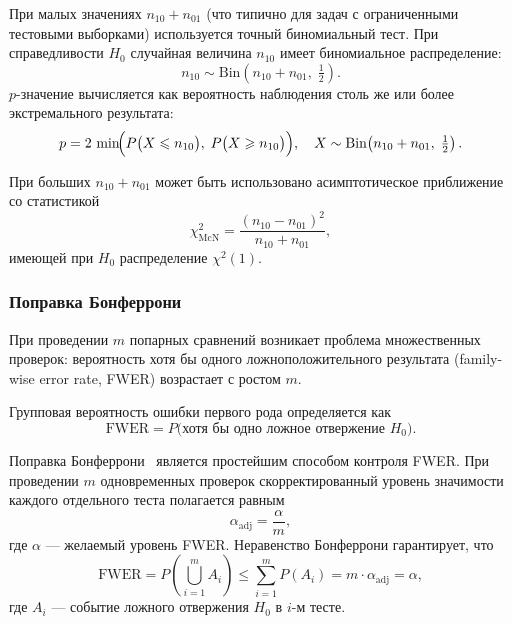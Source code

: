 При малых значениях $n_{10} + n_{01}$ (что типично для задач с
ограниченными тестовыми выборками) используется точный биномиальный
тест. При справедливости $H_0$ случайная величина $n_{10}$ имеет
биномиальное распределение:
\begin{equation}
    n_{10} \sim \mathrm{Bin}\!\left(n_{10} + n_{01},\; \tfrac{1}{2}\right).
    \label{eq:mcnemar-binom}
\end{equation}
$p$-значение вычисляется как вероятность наблюдения столь же или более
экстремального результата:
\begin{equation}
    p = 2\,\min\!\Bigl(
        P\bigl(X \leqslant n_{10}\bigr),\;
        P\bigl(X \geqslant n_{10}\bigr)
    \Bigr),
    \quad X \sim \mathrm{Bin}\!\left(n_{10}+n_{01},\; \tfrac{1}{2}\right).
    \label{eq:mcnemar-pvalue}
\end{equation}

При больших $n_{10} + n_{01}$ может быть использовано асимптотическое
приближение со статистикой
\begin{equation}
    \chi^{2}_{\mathrm{McN}} = \frac{(n_{10} - n_{01})^{2}}{n_{10} + n_{01}},
    \label{eq:mcnemar-chi2}
\end{equation}
имеющей при $H_0$ распределение $\chi^{2}(1)$.

\subsubsection{Поправка Бонферрони}
\label{subsubsec:bonferroni}

При проведении $m$ попарных сравнений возникает проблема множественных
проверок: вероятность хотя бы одного ложноположительного результата
(family-wise error rate, FWER) возрастает с ростом $m$.

\begin{definition}[FWER]
\label{def:fwer}
Групповая вероятность ошибки первого рода определяется как
\begin{equation}
    \mathrm{FWER} = P\bigl(\text{хотя бы одно ложное отвержение } H_0\bigr).
    \label{eq:fwer}
\end{equation}
\end{definition}

Поправка Бонферрони~\cite{bonferroni1936teoria} является простейшим
способом контроля FWER. При проведении $m$ одновременных проверок
скорректированный уровень значимости каждого отдельного теста полагается
равным
\begin{equation}
    \alpha_{\mathrm{adj}} = \frac{\alpha}{m},
    \label{eq:bonferroni}
\end{equation}
где $\alpha$ --- желаемый уровень FWER. Неравенство Бонферрони
гарантирует, что
\begin{equation}
    \mathrm{FWER} = P\!\left(\bigcup_{i=1}^{m} A_i\right)
    \leqslant \sum_{i=1}^{m} P(A_i)
    = m \cdot \alpha_{\mathrm{adj}} = \alpha,
    \label{eq:bonferroni-proof}
\end{equation}
где $A_i$ --- событие ложного отвержения $H_0$ в $i$-м тесте.

